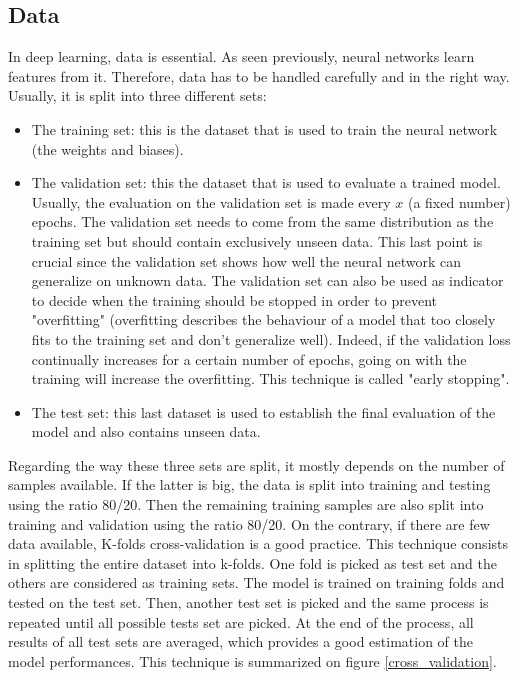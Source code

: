 \subsection{Data}
In deep learning, data is essential. As seen previously, neural networks learn features from it. Therefore, data has to be handled carefully and in the right way. Usually, it is split into three different sets:
\begin{itemize}
\item The training set: this is the dataset that is used to train the neural network (the weights and biases).
\item The validation set: this the dataset that is used to evaluate a trained model.  Usually, the evaluation on the validation set is made every $x$ (a fixed number) epochs. The validation set needs to come from the same distribution as the training set but should contain exclusively unseen data. This last point is crucial since the validation set shows how well the neural network can generalize on unknown data. The validation set can also be used as indicator to decide when the training should be stopped in order to prevent "overfitting" (overfitting describes the behaviour of a model that too closely fits to the training set and don't generalize well). Indeed, if the validation loss continually increases for a certain number of epochs, going on with the training will increase the overfitting. This technique is called "early stopping".
\item The test set: this last dataset is used to establish the final evaluation of the model and also contains unseen data. 
\end{itemize}
Regarding the way these three sets are split, it mostly depends on the number of samples available. If the latter is big, the data is split into training and testing using the ratio 80/20. Then the remaining training samples are also split into training and validation using the ratio 80/20. On the contrary, if there are few data available, K-folds cross-validation is a good practice. This technique consists in splitting the entire dataset into k-folds. One fold is picked as test set and the others are considered as training sets. The model is trained on training folds and tested on the test set. Then, another test set is picked and the same process is repeated until all possible tests set are picked. At the end of the process, all results of all test sets are averaged, which provides a good estimation of the model performances. This technique is summarized on figure \ref{cross_validation}.

